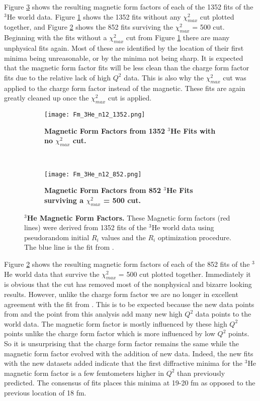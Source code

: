 Figure \ref{fig:3he_fm} shows the resulting magnetic form factors of each of the 1352 fits of the $^3$He world data. Figure \ref{fig:3he_fm_no_cut} shows the 1352 fits without any $\chi^2_{max}$ cut plotted together, and Figure \ref{fig:3he_fm_cut} shows the 852 fits surviving the $\chi^2_{max}$ = 500 cut. Beginning with the fits without a $\chi^2_{max}$ cut from Figure \ref{fig:3he_fm_no_cut} there are many unphysical fits again. Most of these are identified by the location of their first minima being unreasonable, or by the minima not being sharp. It is expected that the magnetic form factor fits will be less clean than the charge form factor fits due to the relative lack of high $Q^2$ data. This is also why the $\chi^2_{max}$ cut was applied to the charge form factor instead of the magnetic. These fits are again greatly cleaned up once the $\chi^2_{max}$ cut is applied.

\begin{figure}[!ht]
\begin{subfigure}{1.\textwidth}
  \centering
  \texttt{[image: Fm\_3He\_n12\_1352.png]}
  \caption{\bf{Magnetic Form Factors from 1352 $^3$He Fits with no $\chi^2_{max}$ cut.}}
  \label{fig:3he_fm_no_cut}
\end{subfigure}\\
\begin{subfigure}{1.\textwidth}
  \centering
  \texttt{[image: Fm\_3He\_n12\_852.png]}
  \caption{\bf{Magnetic Form Factors from 852 $^3$He Fits surviving a $\chi^2_{max}$ = 500 cut.}}
  \label{fig:3he_fm_cut}
\end{subfigure}
\caption[$^3$He Magnetic Form Factors] {
{\bf{$^3$He Magnetic Form Factors.}} These Magnetic form factors (red lines) were derived from 1352 fits of the $^3$He world data using pseudorandom initial $R_i$ values and the $R_i$ optimization procedure. The blue line is the fit from \cite{Article:Amroun}.}
\label{fig:3he_fm}
\end{figure}

Figure \ref{fig:3he_fm_cut} shows the resulting magnetic form factors of each of the 852 fits of the $^3$He world data that survive the $\chi^2_{max}$ = 500 cut plotted together. Immediately it is obvious that the cut has removed most of the nonphysical and bizarre looking results. However, unlike the charge form factor we are no longer in excellent agreement with the fit from \cite{Article:Amroun}. This is to be expected because the new data points from \cite{Article:Alex} and the point from this analysis add many new high $Q^2$ data points to the world data. The magnetic form factor is mostly influenced by these high $Q^2$ points unlike the charge form factor which is more influenced by low $Q^2$ points. So it is unsurprising that the charge form factor remains the same while the magnetic form factor evolved with the addition of new data. Indeed, the new fits with the new datasets added indicate that the first diffractive minima for the $^3$He magnetic form factor is a few femtometers higher in $Q^2$ than previously predicted. The consensus of fits places this minima at 19-20 fm as opposed to the previous location of 18 fm.  

